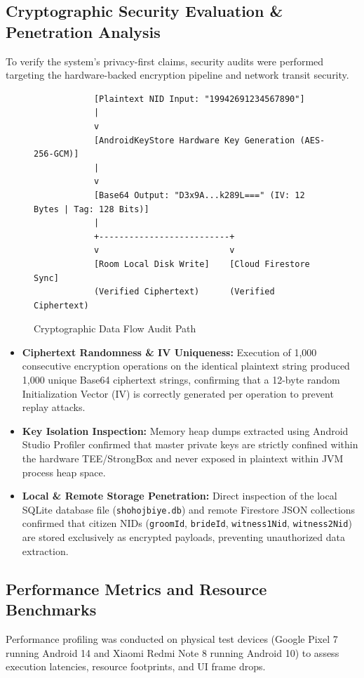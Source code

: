 \documentclass[12pt,a4paper]{article}
\begin{document}
	\subsection{Cryptographic Security Evaluation \& Penetration Analysis}
	To verify the system's privacy-first claims, security audits were performed targeting the hardware-backed encryption pipeline and network transit security.
	
	\begin{figure}[h!]
		\centering
		\begin{lstlisting}
			[Plaintext NID Input: "19942691234567890"]
			|
			v
			[AndroidKeyStore Hardware Key Generation (AES-256-GCM)]
			|
			v
			[Base64 Output: "D3x9A...k289L===" (IV: 12 Bytes | Tag: 128 Bits)]
			|
			+--------------------------+
			v                          v
			[Room Local Disk Write]    [Cloud Firestore Sync]
			(Verified Ciphertext)      (Verified Ciphertext)
		\end{lstlisting}
		\caption{Cryptographic Data Flow Audit Path}
		\label{fig:crypto_flow}
	\end{figure}
	
	\begin{itemize}
		\item \textbf{Ciphertext Randomness \& IV Uniqueness:} Execution of 1,000 consecutive encryption operations on the identical plaintext string produced 1,000 unique Base64 ciphertext strings, confirming that a 12-byte random Initialization Vector (IV) is correctly generated per operation to prevent replay attacks.
		\item \textbf{Key Isolation Inspection:} Memory heap dumps extracted using Android Studio Profiler confirmed that master private keys are strictly confined within the hardware TEE/StrongBox and never exposed in plaintext within JVM process heap space.
		\item \textbf{Local \& Remote Storage Penetration:} Direct inspection of the local SQLite database file (\texttt{shohojbiye.db}) and remote Firestore JSON collections confirmed that citizen NIDs (\texttt{groomId}, \texttt{brideId}, \texttt{witness1Nid}, \texttt{witness2Nid}) are stored exclusively as encrypted payloads, preventing unauthorized data extraction.
	\end{itemize}
	
	\subsection{Performance Metrics and Resource Benchmarks}
	Performance profiling was conducted on physical test devices (Google Pixel 7 running Android 14 and Xiaomi Redmi Note 8 running Android 10) to assess execution latencies, resource footprints, and UI frame drops.
	
\end{document}
